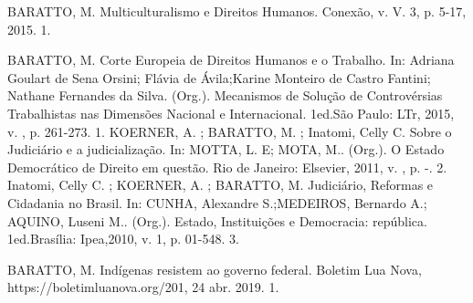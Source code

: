 

\begin{cvhonors}
  \cvhonor
    {BARATTO, M.}
    {Multiculturalismo e Direitos Humanos. Conexão, v. V. 3, p. 5-17, 2015.}
    {}
    {1. }
\end{cvhonors}



\begin{cvhonors}
  \cvhonor
    {BARATTO, M.}
    {Corte Europeia de Direitos Humanos e o Trabalho. In: Adriana Goulart de Sena Orsini; Flávia de Ávila;Karine Monteiro de Castro Fantini; Nathane Fernandes da Silva. (Org.). Mecanismos de Solução de Controvérsias Trabalhistas nas Dimensões Nacional e Internacional. 1ed.São Paulo: LTr, 2015, v. , p. 261-273.}
    {}
    {1. }
  \cvhonor
    {KOERNER, A. ; BARATTO, M. ; Inatomi, Celly C.}
    {Sobre o Judiciário e a judicialização. In: MOTTA, L. E; MOTA, M.. (Org.).
   O Estado Democrático de Direito em questão. Rio de Janeiro: Elsevier, 2011, v. , p. -.}
    {}
    {2. }
  \cvhonor
    {Inatomi, Celly C. ; KOERNER, A. ; BARATTO, M.}
    {Judiciário, Reformas e Cidadania no Brasil. In: CUNHA, Alexandre S.;MEDEIROS, Bernardo A.; AQUINO, Luseni M.. (Org.). Estado, Instituições e Democracia: república. 1ed.Brasília: Ipea,2010, v. 1, p. 01-548.}
    {}
    {3. }
\end{cvhonors}


\begin{cvhonors}
  \cvhonor
    {BARATTO, M.}
    {Indígenas resistem ao governo federal. Boletim Lua Nova, https://boletimluanova.org/201, 24 abr. 2019.}
    {}
    {1. }
\end{cvhonors}


